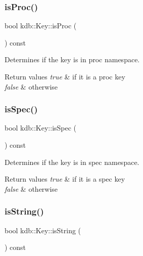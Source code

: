 \subsubsection{\texorpdfstring{is\+Proc()}{isProc()}}
{\footnotesize\ttfamily bool kdb\+::\+Key\+::is\+Proc (\begin{DoxyParamCaption}{ }\end{DoxyParamCaption}) const\hspace{0.3cm}{\ttfamily [inline]}}



Determines if the key is in proc namespace. 


\begin{DoxyRetVals}{Return values}
{\em true} & if it is a proc key \\
\hline
{\em false} & otherwise \\
\hline
\end{DoxyRetVals}
\mbox{\label{classkdb_1_1Key_acf01e9a60bbd0e2768be782d149ac700}} 
\subsubsection{\texorpdfstring{is\+Spec()}{isSpec()}}
{\footnotesize\ttfamily bool kdb\+::\+Key\+::is\+Spec (\begin{DoxyParamCaption}{ }\end{DoxyParamCaption}) const\hspace{0.3cm}{\ttfamily [inline]}}



Determines if the key is in spec namespace. 


\begin{DoxyRetVals}{Return values}
{\em true} & if it is a spec key \\
\hline
{\em false} & otherwise \\
\hline
\end{DoxyRetVals}
\mbox{\label{classkdb_1_1Key_a2170b1d9decef951b478454e3ee0b618}} 
\subsubsection{\texorpdfstring{is\+String()}{isString()}}
{\footnotesize\ttfamily bool kdb\+::\+Key\+::is\+String (\begin{DoxyParamCaption}{ }\end{DoxyParamCaption}) const\hspace{0.3cm}{\ttfamily [inline]}}




